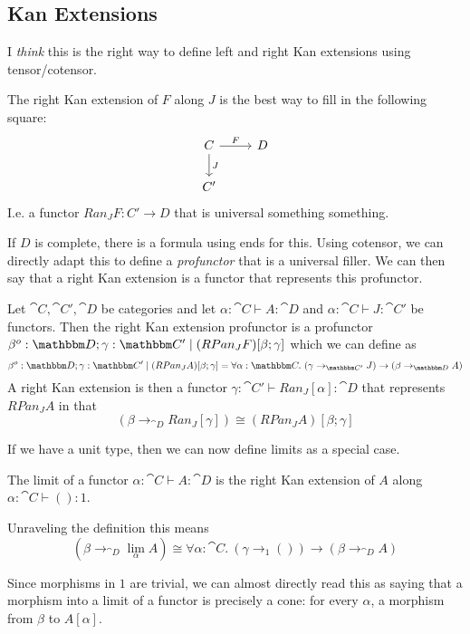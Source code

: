 \documentclass{article}
\begin{document}
\subsection{Kan Extensions}

I \emph{think} this is the right way to define left and right Kan
extensions using tensor/cotensor.

The right Kan extension of $F$ along $J$ is the best way to fill in the following square:
\[%
\begin{tikzcd}
C \arrow[d, "J"] \arrow[r, "F"] & D \\
C'                              &  
\end{tikzcd}\]
I.e. a functor $Ran_J F : C' \to D$ that is universal something something.

If $D$ is complete, there is a formula using ends for this. Using
cotensor, we can directly adapt this to define a \emph{profunctor}
that is a universal filler. We can then say that a right Kan extension
is a functor that represents this profunctor.

\begin{definition}
  Let $\cat C, \cat C', \cat D$ be categories and let $\alpha : \cat C
  \vdash A : \cat D$ and $\alpha : \cat C \vdash J : \cat C'$ be
  functors. Then the right Kan extension profunctor is a profunctor
  $\beta^o:\cat D; \gamma:\cat C' \pipe (RPan_J F)[\beta;\gamma]$ which we can define as
  \[ \beta^o:\cat D; \gamma:\cat C' \pipe (RPan_J A)[\beta;\gamma] = \forall \alpha:\cat C.~ (\gamma \to_{\cat C'} J) \to (\beta \to_{\cat D} A)
  \]
  A right Kan extension is then a functor $\gamma:\cat C' \vdash
  Ran_J[\alpha] : \cat D$ that represents $RPan_J A$ in that
  \[ (\beta \to_{\cat D} Ran_J[\gamma]) \cong (RPan_J A)[\beta;\gamma] \]
\end{definition}

If we have a unit type, then we can now define limits as a special
case.
\begin{definition}
  The limit of a functor $\alpha : \cat C \vdash A : \cat D$ is the
  right Kan extension of $A$ along $\alpha : \cat C \vdash () : 1$.

  Unraveling the definition this means
  \[ (\beta \to_{\cat D} \lim_\alpha A) \cong \forall \alpha:\cat C.~ (\gamma \to_{1} ()) \to (\beta \to_{\cat D} A) \]
\end{definition}
Since morphisms in $1$ are trivial, we can almost directly read this
as saying that a morphism into a limit of a functor is precisely a
cone: for every $\alpha$, a morphism from $\beta$ to $A[\alpha]$.
\end{document}
